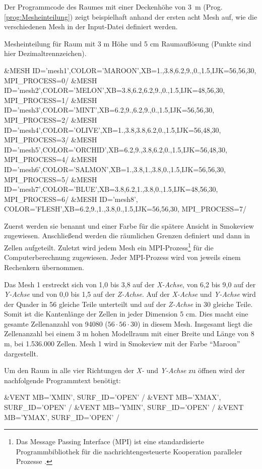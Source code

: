 Der Programmcode des Raumes mit einer Deckenhöhe von 3~m (Prog. \ref{prog:Mesheinteilung}) zeigt beispielhaft anhand der ersten acht Mesh auf, wie die verschiedenen Mesh in der Input-Datei definiert werden. 
\begin{program}
\caption{Mesheinteilung für Raum mit 3 m Höhe und 5 cm Raumauflösung (Punkte sind hier Dezimaltrennzeichen).}
\label{prog:Mesheinteilung}
\begin{GenericCode}[numbers=none]
&MESH ID='mesh1',COLOR='MAROON',XB=1.,3.8,6.2,9.,0.,1.5,IJK=56,56,30, MPI_PROCESS=0/
&MESH ID='mesh2',COLOR='MELON',XB=3.8,6.2,6.2,9.,0.,1.5,IJK=48,56,30, MPI_PROCESS=1/
&MESH ID='mesh3',COLOR='MINT',XB=6.2,9.,6.2,9.,0.,1.5,IJK=56,56,30, MPI_PROCESS=2/
&MESH ID='mesh4',COLOR='OLIVE',XB=1.,3.8,3.8,6.2,0.,1.5,IJK=56,48,30, MPI_PROCESS=3/
&MESH ID='mesh5',COLOR='ORCHID',XB=6.2,9.,3.8,6.2,0.,1.5,IJK=56,48,30, MPI_PROCESS=4/
&MESH ID='mesh6',COLOR='SALMON',XB=1.,3.8,1.,3.8,0.,1.5,IJK=56,56,30, MPI_PROCESS=5/
&MESH ID='mesh7',COLOR='BLUE',XB=3.8,6.2,1.,3.8,0.,1.5,IJK=48,56,30, MPI_PROCESS=6/
&MESH ID='mesh8', COLOR='FLESH',XB=6.2,9.,1.,3.8,0.,1.5,IJK=56,56,30, MPI_PROCESS=7/
\end{GenericCode}
\end{program}%
Zuerst werden sie benannt und einer Farbe für die spätere Ansicht in Smokeview zugewiesen. Anschließend werden die räumlichen Grenzen definiert und dann in Zellen aufgeteilt. Zuletzt wird jedem Mesh ein MPI-Prozess\footnote{Das Message Passing Interface (MPI) ist eine standardisierte Programmbibliothek für die nachrichtengesteuerte Kooperation paralleler Prozesse \cite{MPIInfo}.} für die Computerberechnung zugewiesen. Jeder MPI-Prozess wird von jeweils einem Rechenkern übernommen.%


Das Mesh 1 erstreckt sich von 1,0 bis 3,8 auf der \emph{X-Achse}, von 6,2 bis 9,0 auf der \emph{Y-Achse} und von 0,0 bis 1,5 auf der \emph{Z-Achse}. Auf der \emph{X-Achse} und \emph{Y-Achse} wird der Quader in 56 gleiche Teile unterteilt und auf der \emph{Z-Achse} in 30 gleiche Teile. Somit ist die Kantenlänge der Zellen in jeder Dimension 5 cm. Dies macht eine gesamte Zellenanzahl von 94080 ($56\cdot 56 \cdot 30$) in diesem Mesh. Insgesamt liegt die Zellenanzahl bei einem 3 m hohen Modellraum mit einer Breite und Länge von 8 m, bei 1.536.000 Zellen. Mesh 1 wird in Smokeview mit der Farbe "`Maroon"' dargestellt. 

Um den Raum in alle vier Richtungen der \emph{X-} und \emph{Y-Achse} zu öffnen wird der nachfolgende Programmtext benötigt:
\begin{GenericCode}[numbers=none]
&VENT MB='XMIN', SURF_ID='OPEN' /  
&VENT MB='XMAX', SURF_ID='OPEN' /  
&VENT MB='YMIN', SURF_ID='OPEN' /  
&VENT MB='YMAX', SURF_ID='OPEN' / 
\end{GenericCode}



